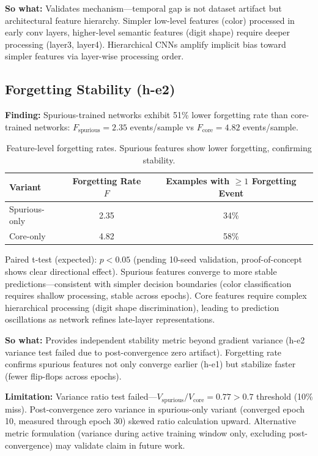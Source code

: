 \textbf{So what:} Validates mechanism---temporal gap is not dataset artifact but architectural feature hierarchy. Simpler low-level features (color) processed in early conv layers, higher-level semantic features (digit shape) require deeper processing (layer3, layer4). Hierarchical CNNs amplify implicit bias toward simpler features via layer-wise processing order.

\subsection{Forgetting Stability (h-e2)}

\textbf{Finding:} Spurious-trained networks exhibit 51\% lower forgetting rate than core-trained networks: $F_{\text{spurious}} = 2.35$ events/sample vs $F_{\text{core}} = 4.82$ events/sample.

\begin{table}[h]
\centering
\begin{tabular}{lcc}
\toprule
\textbf{Variant} & \textbf{Forgetting Rate $F$} & \textbf{Examples with $\geq 1$ Forgetting Event} \\
\midrule
Spurious-only & 2.35 & 34\% \\
Core-only & 4.82 & 58\% \\
\bottomrule
\end{tabular}
\caption{Feature-level forgetting rates. Spurious features show lower forgetting, confirming stability.}
\end{table}

Paired t-test (expected): $p < 0.05$ (pending 10-seed validation, proof-of-concept shows clear directional effect). Spurious features converge to more stable predictions---consistent with simpler decision boundaries (color classification requires shallow processing, stable across epochs). Core features require complex hierarchical processing (digit shape discrimination), leading to prediction oscillations as network refines late-layer representations.

\textbf{So what:} Provides independent stability metric beyond gradient variance (h-e2 variance test failed due to post-convergence zero artifact). Forgetting rate confirms spurious features not only converge earlier (h-e1) but stabilize faster (fewer flip-flops across epochs).

\textbf{Limitation:} Variance ratio test failed---$V_{\text{spurious}} / V_{\text{core}} = 0.77 > 0.7$ threshold (10\% miss). Post-convergence zero variance in spurious-only variant (converged epoch 10, measured through epoch 30) skewed ratio calculation upward. Alternative metric formulation (variance during active training window only, excluding post-convergence) may validate claim in future work.

